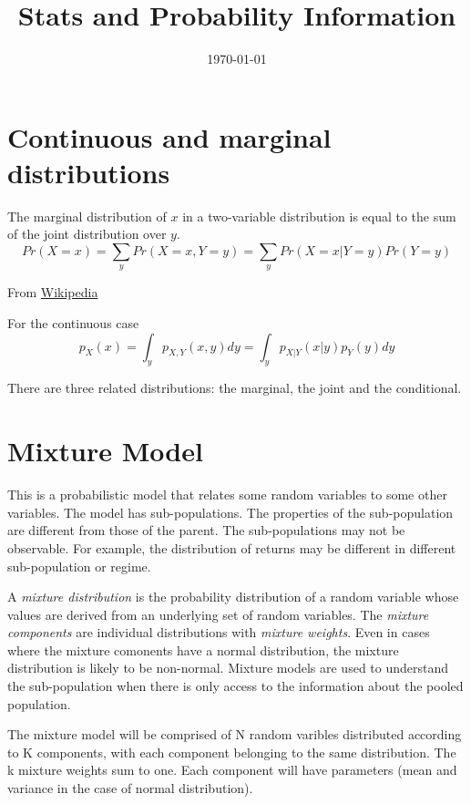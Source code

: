 \documentclass[12pt, a4paper, oneside]{article}\usepackage[]{graphicx}\usepackage[]{color}
\begin{document}
\title{Stats and Probability Information}
\date{\today}
\maketitle
\section*{Continuous and marginal distributions}

The marginal distribution of $x$ in a two-variable distribution is equal to the sum of the joint distribution over $y$. 
\begin{equation}
Pr(X = x) = \sum_y Pr(X = x, Y = y) = \sum_y Pr(X = x|Y = y)Pr(Y = y)
\end{equation}

From \href{http://en.wikipedia.org/wiki/Marginal_distribution}{Wikipedia}

For the continuous case
\begin{equation}
p_X(x) = \int_y p_{X,Y}(x,y)dy = \int_y p_{X|Y}(x|y)p_Y(y)dy
\end{equation}

There are three related distributions:  the marginal, the joint and the conditional. 

\section{Mixture Model}
This is a probabilistic model that relates some random variables to some other variables.  The model has sub-populations. The properties of the sub-population are different from those of the parent. The sub-populations may not be observable.  For example, the distribution of returns may be different in different sub-population or regime. 

A \emph{mixture distribution} is the probability distribution of a random variable  whose values are derived from an underlying set of random variables. The \emph{mixture components} are individual distributions with \emph{mixture weights}.  Even in cases where the mixture comonents have a normal distribution, the mixture distribution is likely to be non-normal. Mixture models are used to understand the sub-population when there is only access to the information about the pooled population. 

The mixture model will be comprised of N random varibles distributed according to K components, with each component belonging to the same distribution. The k mixture weights sum to one. Each component will have parameters (mean and variance in the case of normal distribution).  
\end{document}
